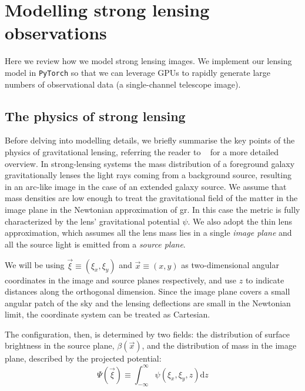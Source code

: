 \section{Modelling strong lensing observations}  \label{sec:sl-model}

Here we review how we model strong lensing images. We implement our lensing model in \texttt{PyTorch} \citep{pytorch} so that we can leverage GPUs to rapidly generate large numbers of observational data (a single-channel telescope image).

\subsection{The physics of strong lensing}
Before delving into modelling details, we briefly summarise the key points of the physics of gravitational lensing, referring the reader to \eg~\cite{Meneghetti:2016aa} for a more detailed overview. In strong-lensing systems the mass distribution of a foreground galaxy gravitationally lenses the light rays coming from a background source, resulting in an arc-like image in the case of an extended galaxy source. We assume that mass densities are low enough to treat the gravitational field of the matter in the image plane in the Newtonian approximation of \gls*{gr}. In this case the metric is fully characterized by the lens' gravitational potential $\psi$. We also adopt the thin lens approximation, which assumes all the lens mass lies in a single \emph{image plane} and all the source light is emitted from a \emph{source plane}. 

We will be using $\vec{\xi}\equiv(\xi_x, \xi_y)$ and $\vec{x}\equiv(x, y)$ as two-dimensional angular coordinates in the image and source planes respectively, and use $z$ to indicate distances along the orthogonal dimension. Since the image plane covers a small angular patch of the sky and the lensing deflections are small in the Newtonian limit, the coordinate system can be treated as Cartesian.

The configuration, then, is determined by two fields: the distribution of surface brightness in the source plane, $\beta(\vec{x})$, and the distribution of mass in the image plane, described by the projected potential:
\begin{equation}
	\Psi(\vec{\xi})\equiv \int_{-\infty}^{\infty} \psi(\xi_x, \xi_y, z) \mathrm{d}z
\end{equation}

